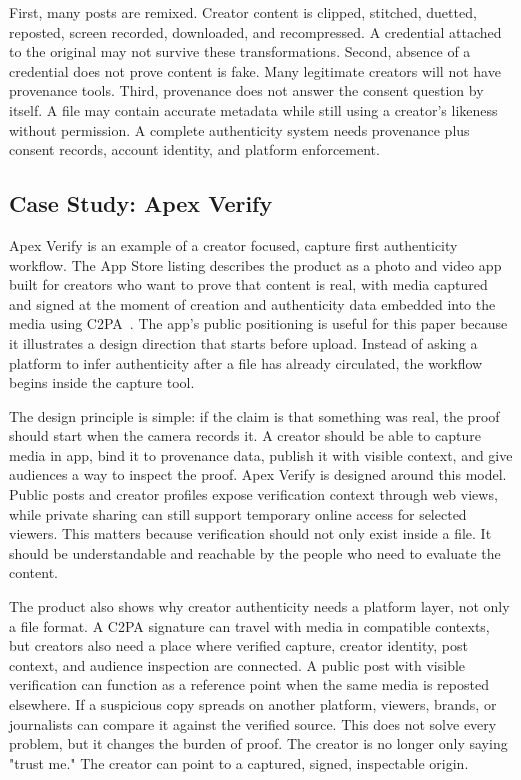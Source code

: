 \documentclass[11pt]{article}
\begin{document}
First, many posts are remixed. Creator content is clipped, stitched, duetted, reposted, screen recorded, downloaded, and recompressed. A credential attached to the original may not survive these transformations. Second, absence of a credential does not prove content is fake. Many legitimate creators will not have provenance tools. Third, provenance does not answer the consent question by itself. A file may contain accurate metadata while still using a creator's likeness without permission. A complete authenticity system needs provenance plus consent records, account identity, and platform enforcement.

\subsection{Case Study: Apex Verify}

Apex Verify is an example of a creator focused, capture first authenticity workflow. The App Store listing describes the product as a photo and video app built for creators who want to prove that content is real, with media captured and signed at the moment of creation and authenticity data embedded into the media using C2PA~\cite{apexVerifyAppStore}. The app's public positioning is useful for this paper because it illustrates a design direction that starts before upload. Instead of asking a platform to infer authenticity after a file has already circulated, the workflow begins inside the capture tool.

The design principle is simple: if the claim is that something was real, the proof should start when the camera records it. A creator should be able to capture media in app, bind it to provenance data, publish it with visible context, and give audiences a way to inspect the proof. Apex Verify is designed around this model. Public posts and creator profiles expose verification context through web views, while private sharing can still support temporary online access for selected viewers. This matters because verification should not only exist inside a file. It should be understandable and reachable by the people who need to evaluate the content.

The product also shows why creator authenticity needs a platform layer, not only a file format. A C2PA signature can travel with media in compatible contexts, but creators also need a place where verified capture, creator identity, post context, and audience inspection are connected. A public post with visible verification can function as a reference point when the same media is reposted elsewhere. If a suspicious copy spreads on another platform, viewers, brands, or journalists can compare it against the verified source. This does not solve every problem, but it changes the burden of proof. The creator is no longer only saying "trust me." The creator can point to a captured, signed, inspectable origin.
\end{document}
